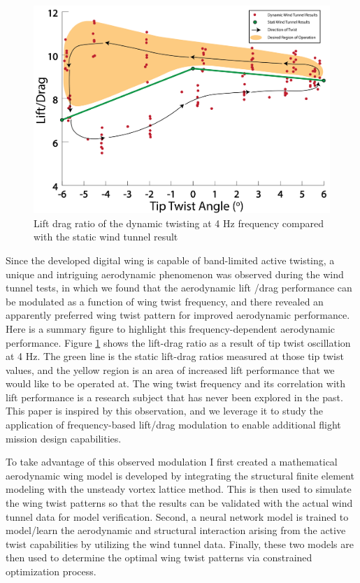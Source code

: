 \documentclass[11pt]{ucthesis}
\begin{document}
\begin{figure}[thpb]
\centering
\includegraphics[width=.75\linewidth]{./Figures/LD5454MotivationPlot.png}
\caption{Lift drag ratio of the dynamic twisting at 4 Hz frequency compared with the static wind tunnel result}
\label{fig:LDmot}
\end{figure}

Since the developed digital wing is capable of band-limited active twisting, a unique and intriguing aerodynamic phenomenon was observed during the wind tunnel tests, in which we found that the aerodynamic lift /drag performance can be modulated as a function of wing twist frequency, and there revealed an apparently preferred wing twist pattern for improved aerodynamic performance. Here is a summary figure to highlight this frequency-dependent aerodynamic performance. Figure \ref{fig:LDmot} shows the lift-drag ratio as a result of tip twist oscillation at 4 Hz. The green line is the static lift-drag ratios measured at those tip twist values, and the yellow region is an area of increased lift performance that we would like to be operated at. The wing twist frequency and its correlation with lift performance is a research subject that has never been explored in the past. This paper is inspired by this observation, and we leverage it to study the application of frequency-based lift/drag modulation to enable additional flight mission design capabilities. 

To take advantage of this observed modulation I first created a mathematical aerodynamic wing model is developed by integrating the structural finite element modeling with the unsteady vortex lattice method. This is then used to simulate the wing twist patterns so that the results can be validated with the actual wind tunnel data for model verification. Second, a neural network model is trained to model/learn the aerodynamic and structural interaction arising from the active twist capabilities by utilizing the wind tunnel data. Finally, these two models are then used to determine the optimal wing twist patterns via constrained optimization process.
\end{document}
